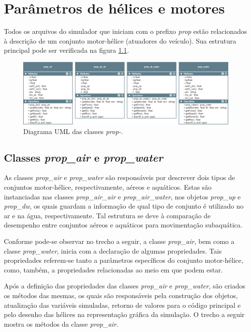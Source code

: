 \chapter{Parâmetros de hélices e motores}
\label{sec:prop}
Todos os arquivos do simulador que iniciam com o prefixo \emph{prop} estão relacionados à descrição de um conjunto motor-hélice (atuadores do veículo). Sua estrutura principal pode ser verificada na figura \ref{fig:uml-01}.

\begin{figure}[!htb]
    \centering
    \includegraphics[width=\linewidth]{imagens/uml1.png}
    \caption{Diagrama UML das classes \emph{prop-}.}
    \label{fig:uml-01}
\end{figure}

\section{Classes \emph{prop\_air} e \emph{prop\_water}}
As classes \emph{prop\_air} e \emph{prop\_water} são responsáveis por descrever dois tipos de conjuntos motor-hélice, respectivamente, aéreos e aquáticos. Estas são instanciadas nas classes \emph{prop\_air\_air} e \emph{prop\_air\_water}, nos objetos \emph{prop\_up} e \emph{prop\_dw}, os quais guardam a informação de qual tipo de conjunto é utilizado no ar e na água, respectivamente. Tal estrutura se deve à comparação de desempenho entre conjuntos aéreos e aquáticos para movimentação subaquática.

Conforme pode-se observar no trecho a seguir, a classe \emph{prop\_air}, bem como a classe \emph{prop\_water}, inicia com a declaração de algumas propriedades. Tais propriedades referem-se tanto a parâmetros específicos do conjunto motor-hélice, como, também, a propriedades relacionadas ao meio em que podem estar.



Após a definição das propriedades das classes \emph{prop\_air} e \emph{prop\_water}, são criados os métodos das mesmas, os quais são responsáveis pela construção dos objetos, atualização das variáveis simuladas, retorno de valores para o código principal e pelo desenho das hélices na representação gráfica da simulação. O trecho a seguir mostra os métodos da classe \emph{prop\_air}.

